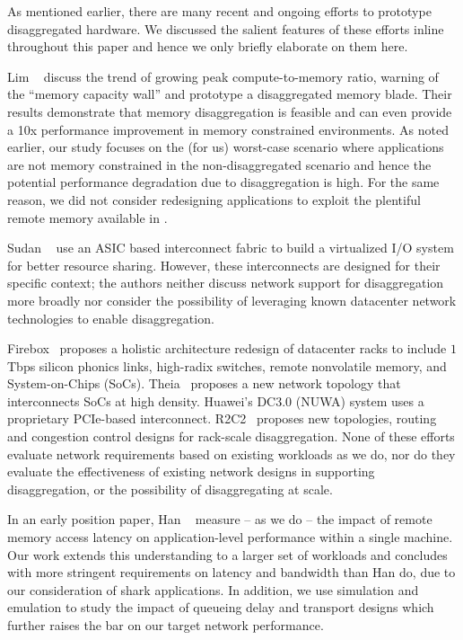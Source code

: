 As mentioned earlier, there are many recent and ongoing efforts to prototype disaggregated hardware. We discussed the salient features of these efforts inline throughout this paper and hence we only briefly elaborate on them here. 

Lim \etal~\cite{ddcHwDesign1, ddcHwDesign2} discuss the trend of growing peak compute-to-memory ratio, warning of the ``memory capacity wall'' and prototype a disaggregated memory blade. Their results demonstrate that memory disaggregation is feasible and can even provide a 10x performance improvement in memory constrained environments. As noted earlier, our study focuses on the (for us) worst-case scenario where applications are not memory constrained in the non-disaggregated scenario and hence the potential performance degradation due to disaggregation is high. For the same reason, we did not consider redesigning applications to exploit the plentiful remote memory available in \dis {}.

Sudan \etal~\cite{ddcHwDesign3} use an ASIC based interconnect fabric to build a virtualized I/O system for better resource sharing. However, these interconnects are designed for their specific context; the authors neither discuss network support for disaggregation more broadly nor consider the possibility of leveraging known datacenter network technologies to enable disaggregation.

Firebox~\cite{firebox} proposes a holistic architecture redesign of datacenter racks to include $1$Tbps silicon phonics links, high-radix switches, remote nonvolatile memory, and System-on-Chips (SoCs). Theia~\cite{theia} proposes a new network topology that interconnects SoCs at high density. Huawei's DC3.0 (NUWA) system uses a proprietary PCIe-based interconnect. R2C2~\cite{r2c2} proposes new topologies, routing and congestion control designs for rack-scale disaggregation.
None of these efforts evaluate network requirements based on existing workloads as we do, nor do they evaluate the effectiveness of existing network designs in supporting disaggregation, or the possibility of disaggregating at scale.


In an early position paper, Han \etal~\cite{hotnets} measure -- as we do -- the impact of remote memory access latency on application-level performance within a single machine. Our work extends this  understanding to a larger set of workloads and concludes with more stringent requirements on latency and bandwidth than Han \etal do, due to our consideration of shark applications. In addition, we use simulation and emulation to study the impact of queueing delay and transport designs which further raises the bar on our target network performance.

